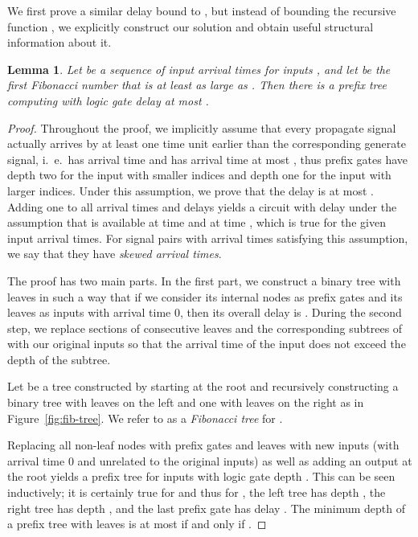 \documentclass[11pt,final,microtype]{scrartcl}
\theoremstyle{plain}
\newtheorem{lemma}[theorem]{Lemma}
\theoremstyle{definition}
\theoremstyle{remark}
\newcommand{\tikzfigs}[3]{
  \begin{figure}[!tb]\centering{\resizebox{#2\linewidth}{!}{\begin{tikzpicture}
          
        \end{tikzpicture}}\caption{#1}\label{fig:#3}}\end{figure}}
\begin{document}
We first prove a similar delay bound to \cite{bonn1}, but instead of
bounding the recursive function , we explicitly construct
our solution and obtain useful structural information about it.

\begin{lemma} \label{lem:fib-pfx} Let  be a sequence of input arrival times for inputs , and let  be the first Fibonacci number that is
  at least as large as . Then there
  is a prefix tree computing  with
  logic gate delay at most .
\end{lemma} 

\begin{proof}
Throughout the proof, we implicitly assume that every propagate signal
actually arrives by at least one time unit earlier than the
corresponding generate signal, i.\ e.\  has arrival time 
and  has arrival time at most , thus prefix gates have
depth two for the input with smaller indices and depth one for the
input with larger indices. Under this assumption, we prove that the
delay is at most . Adding one to all arrival times and delays
yields a circuit with delay  under the assumption that  is
available at time  and  at time , which is true for
the given input arrival times. For signal pairs  with
arrival times satisfying this assumption, we say that they have
\emph{skewed arrival times}.

  The proof has two main parts. In the first part, we construct a
  binary tree  with  leaves in such a way that if we consider
  its internal nodes as prefix gates and its leaves as inputs with
  arrival time 0, then its overall delay is . During the second
  step, we replace sections of consecutive leaves and the
  corresponding subtrees of  with our original inputs so that the
  arrival time of the input does not exceed the depth of the subtree.

  Let  be a tree constructed by starting at the root  and
  recursively constructing a binary tree with  leaves on the
  left and one with  leaves on the right as in
  Figure~\ref{fig:fib-tree}. We refer to  as a \emph{Fibonacci
    tree} for .

  \tikzfigs{Fibonacci tree  for }{0.55}{fib-tree}

  Replacing all non-leaf nodes with prefix gates and leaves with new
  inputs (with arrival time 0 and unrelated to the original inputs) as
  well as adding an output at the root yields a prefix tree for 
  inputs with logic gate depth . This can be seen inductively; it
  is certainly true for  and thus for , the left tree
  has depth , the right tree has depth , and the last prefix
  gate has delay . The minimum depth of a
  prefix tree with  leaves is at most  if and only if .


\end{proof}
\end{document}
